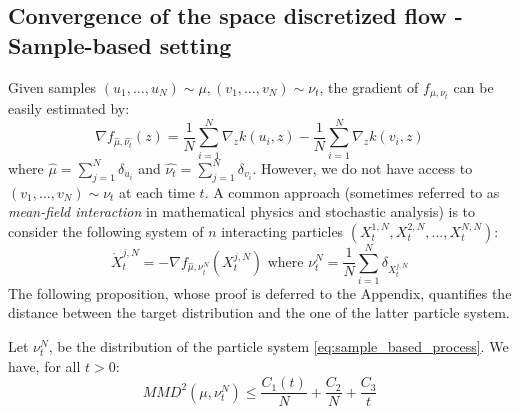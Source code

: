 \subsection{Convergence of the space discretized flow - Sample-based setting}

Given samples $(u_1, \dots, u_N)\sim \mu, (v_1, \dots, v_N)\sim \nu_t$, the gradient of $f_{\mu, \nu_t}$ can be easily estimated by:
\begin{equation}
\nabla f_{\widehat{\mu},\widehat{\nu_t}}(z)= \frac{1}{N}\sum_{i=1}^{N}\nabla_{z}k(u_i,z) -\frac{1}{N}\sum_{i=1}^{N}\nabla_{z}k(v_i,z) 
\end{equation}
where $\widehat{ \mu}=\sum_{j=1}^{N}\delta_{u_i}$ and $\widehat{ \nu_t}=\sum_{j=1}^{N}\delta_{v_i}$. However, we do not have access to $(v_1, \dots, v_N)\sim \nu_t$ at each time $t$. A common approach (sometimes referred to as \textit{mean-field interaction} in mathematical physics and stochastic analysis) is to consider the following system of $n$ interacting particles $(X_t^{1,N}, X_t^{2,N}, \dots, X_t^{N,N})$: 
\begin{equation}\label{eq:sample_based_process}
\dot{X}_t^{j,N}=-\nabla f_{\widehat{\mu}, \nu_t^N}(X_t^{j,N}) \text{ where } \nu_t^N=\frac{1}{N} \sum_{i=1}^N \delta_{X_t^{j,N}}
\end{equation}
The following proposition, whose proof is deferred to the Appendix, quantifies the distance between the target distribution and the one of the latter particle system.
\begin{proposition}\label{prop:sample_based_rates}
	 Let $\nu_t^N$, be the distribution of the particle system \eqref{eq:sample_based_process}. We have, for all $t>0$:
	\begin{equation}
	MMD^2(\mu,\nu_t^N)\le \frac{C_1(t)}{N}+ \frac{C_2}{N} + \frac{C_3}{t}
	\end{equation}
\end{proposition}

